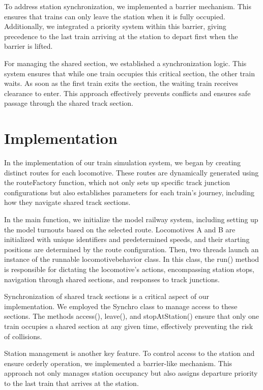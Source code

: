 \documentclass{article}
\begin{document}
    To address station synchronization, we implemented a barrier mechanism. This ensures that trains can only leave the station when it is fully occupied. Additionally, we integrated a priority system within this barrier, giving precedence to the last train arriving at the station to depart first when the barrier is lifted.

    For managing the shared section, we established a synchronization logic. This system ensures that while one train occupies this critical section, the other train waits. As soon as the first train exits the section, the waiting train receives clearance to enter. This approach effectively prevents conflicts and ensures safe passage through the shared track section.

    \section{Implementation}

    In the implementation of our train simulation system, we began by creating distinct routes for each locomotive. These routes are dynamically generated using the routeFactory function, which not only sets up specific track junction configurations but also establishes parameters for each train's journey, including how they navigate shared track sections.

    In the main function, we initialize the model railway system, including setting up the model turnouts based on the selected route. Locomotives A and B are initialized with unique identifiers and predetermined speeds, and their starting positions are determined by the route configuration. Then, two threads launch an instance of the runnable locomotivebehavior class. In this class, the run() method is responsible for dictating the locomotive's actions, encompassing station stops, navigation through shared sections, and responses to track junctions.

    Synchronization of shared track sections is a critical aspect of our implementation. We employed the Synchro class to manage access to these sections. The methods access(), leave(), and stopAtStation() ensure that only one train occupies a shared section at any given time, effectively preventing the risk of collisions.

    Station management is another key feature. To control access to the station and ensure orderly operation, we implemented a barrier-like mechanism. This approach not only manages station occupancy but also assigns departure priority to the last train that arrives at the station.
\end{document}
